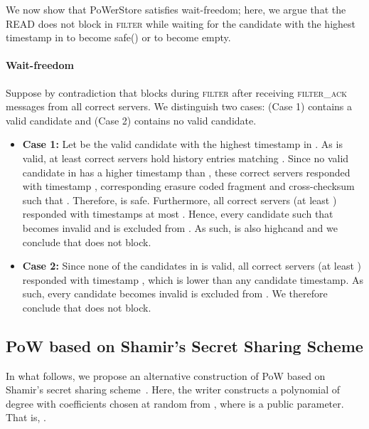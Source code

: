 \documentclass[10pt,conference,compsocconf]{IEEEtran}
\newcommand{\protocol}{PoWerStore}
\begin{document}
We now show that \protocol{} satisfies wait-freedom; here, we argue that the \textsc{READ} does not block in \textsc{filter} while waiting for the candidate  with the highest timestamp in  to become \textsf{safe}() or  to become empty.

\paragraph{Wait-freedom}
Suppose by contradiction that  blocks during \textsc{filter} after receiving \textsc{filter\_ack} messages from all correct servers. We distinguish two cases: (Case 1)  contains a valid candidate and (Case 2)  contains no valid candidate.

\begin{itemize}
\item \textbf{Case 1:} Let  be the valid candidate with the highest timestamp in . As  is valid, at least  correct servers hold history entries matching . Since no valid candidate in  has a higher timestamp than , these  correct servers responded with timestamp , corresponding erasure coded fragment  and cross-checksum  such that . Therefore,  is \textsf{safe}. Furthermore, all correct servers (at least ) responded with timestamps at most . Hence, every candidate  such that  becomes \textsf{invalid}  and is excluded from . As such,  is also \textsf{highcand} and we conclude that  does not block.
\item \textbf{Case 2:} Since none of the candidates in  is valid, all correct servers (at least ) responded with timestamp , which is lower than any candidate timestamp. As such,  every candidate   becomes \textsf{invalid} is excluded from . We therefore conclude that  does not block.
\end{itemize}



\subsection{PoW based on Shamir's Secret Sharing Scheme}\label{subsec:shamir}

In what follows, we propose an alternative construction of PoW based on Shamir's secret sharing scheme~\cite{Sha79}.
Here, the writer constructs a polynomial  of degree  with coefficients  chosen at random from , where  is a public parameter. That is,
.
\end{document}
